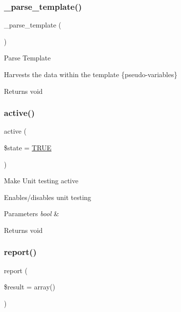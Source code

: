 \subsubsection{\texorpdfstring{\+\_\+parse\+\_\+template()}{\_parse\_template()}}
{\footnotesize\ttfamily \+\_\+parse\+\_\+template (\begin{DoxyParamCaption}{ }\end{DoxyParamCaption})\hspace{0.3cm}{\ttfamily [protected]}}

Parse Template

Harvests the data within the template \{pseudo-\/variables\}

\begin{DoxyReturn}{Returns}
void 
\end{DoxyReturn}
\mbox{\label{class_c_i___unit__test_ac7b3030630fc7dd31513c75cf27c1a8a}} 
\subsubsection{\texorpdfstring{active()}{active()}}
{\footnotesize\ttfamily active (\begin{DoxyParamCaption}\item[{}]{\$state = {\ttfamily \mbox{\hyperlink{constants_8php_ae04a3efe6aa42044f803ee90c2277846}{T\+R\+UE}}} }\end{DoxyParamCaption})}

Make Unit testing active

Enables/disables unit testing


\begin{DoxyParams}{Parameters}
{\em bool} & \\
\hline
\end{DoxyParams}
\begin{DoxyReturn}{Returns}
void 
\end{DoxyReturn}
\mbox{\label{class_c_i___unit__test_a339c46eabb709c1c492bc264c9634171}} 
\subsubsection{\texorpdfstring{report()}{report()}}
{\footnotesize\ttfamily report (\begin{DoxyParamCaption}\item[{}]{\$result = {\ttfamily array()} }\end{DoxyParamCaption})}

